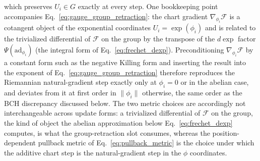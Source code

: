 \documentclass[11pt]{article}
\begin{document}
which preserves $U_i \in G$ exactly at every step. One bookkeeping point accompanies Eq.~\eqref{eq:gauge_group_retraction}: the chart gradient $\nabla_{\phi_i}\mathcal{F}$ is a cotangent object of the exponential coordinates $U_i = \exp(\phi_i)$ and is related to the trivialized differential of $\mathcal{F}$ on the group by the transpose of the $d\exp$ factor $\Psi(\mathrm{ad}_{\phi_i})$ (the integral form of Eq.~\eqref{eq:frechet_dexp}). Preconditioning $\nabla_{\phi_i}\mathcal{F}$ by a constant form such as the negative Killing form and inserting the result into the exponent of Eq.~\eqref{eq:gauge_group_retraction} therefore reproduces the Riemannian natural-gradient step exactly only at $\phi_i = 0$ or in the abelian case, and deviates from it at first order in $\|\phi_i\|$ otherwise, the same order as the BCH discrepancy discussed below. The two metric choices are accordingly not interchangeable across update forms: a trivialized differential of $\mathcal{F}$ on the group, the kind of object the abelian approximation below Eq.~\eqref{eq:frechet_dexp} computes, is what the group-retraction slot consumes, whereas the position-dependent pullback metric of Eq.~\eqref{eq:pullback_metric} is the choice under which the additive chart step is the natural-gradient step in the $\phi$ coordinates.
\end{document}
